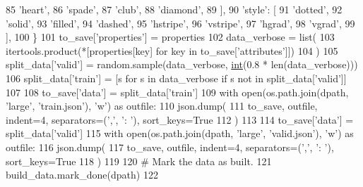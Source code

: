 \begin{DoxyCode}
85                 \textcolor{stringliteral}{'heart'},
86                 \textcolor{stringliteral}{'spade'},
87                 \textcolor{stringliteral}{'club'},
88                 \textcolor{stringliteral}{'diamond'},
89             ],
90             \textcolor{stringliteral}{'style'}: [
91                 \textcolor{stringliteral}{'dotted'},
92                 \textcolor{stringliteral}{'solid'},
93                 \textcolor{stringliteral}{'filled'},
94                 \textcolor{stringliteral}{'dashed'},
95                 \textcolor{stringliteral}{'hstripe'},
96                 \textcolor{stringliteral}{'vstripe'},
97                 \textcolor{stringliteral}{'hgrad'},
98                 \textcolor{stringliteral}{'vgrad'},
99             ],
100         \}
101         to\_save[\textcolor{stringliteral}{'properties'}] = properties
102         data\_verbose = list(
103             itertools.product(*[properties[key] \textcolor{keywordflow}{for} key \textcolor{keywordflow}{in} to\_save[\textcolor{stringliteral}{'attributes'}]])
104         )
105         split\_data[\textcolor{stringliteral}{'valid'}] = random.sample(data\_verbose, \hyperlink{namespacelanguage__model_1_1eval__ppl_a7d12ee00479673c5c8d1f6d01faa272a}{int}(0.8 * len(data\_verbose)))
106         split\_data[\textcolor{stringliteral}{'train'}] = [s \textcolor{keywordflow}{for} s \textcolor{keywordflow}{in} data\_verbose \textcolor{keywordflow}{if} s \textcolor{keywordflow}{not} \textcolor{keywordflow}{in} split\_data[\textcolor{stringliteral}{'valid'}]]
107 
108         to\_save[\textcolor{stringliteral}{'data'}] = split\_data[\textcolor{stringliteral}{'train'}]
109         with open(os.path.join(dpath, \textcolor{stringliteral}{'large'}, \textcolor{stringliteral}{'train.json'}), \textcolor{stringliteral}{'w'}) \textcolor{keyword}{as} outfile:
110             json.dump(
111                 to\_save, outfile, indent=4, separators=(\textcolor{stringliteral}{','}, \textcolor{stringliteral}{': '}), sort\_keys=\textcolor{keyword}{True}
112             )
113 
114         to\_save[\textcolor{stringliteral}{'data'}] = split\_data[\textcolor{stringliteral}{'valid'}]
115         with open(os.path.join(dpath, \textcolor{stringliteral}{'large'}, \textcolor{stringliteral}{'valid.json'}), \textcolor{stringliteral}{'w'}) \textcolor{keyword}{as} outfile:
116             json.dump(
117                 to\_save, outfile, indent=4, separators=(\textcolor{stringliteral}{','}, \textcolor{stringliteral}{': '}), sort\_keys=\textcolor{keyword}{True}
118             )
119 
120         \textcolor{comment}{# Mark the data as built.}
121         build\_data.mark\_done(dpath)
122 \end{DoxyCode}
